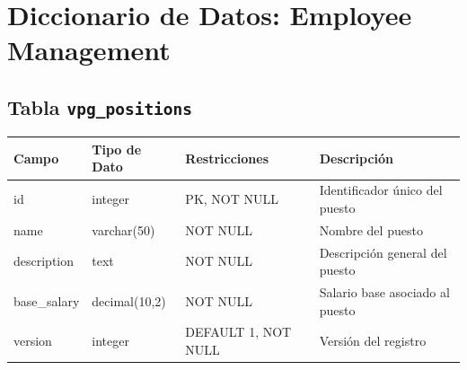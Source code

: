 \section{Diccionario de Datos: Employee Management}
\begin{center}
	\subsection{Tabla \texttt{vpg\_positions}}
	\small
	\begin{tabular}{|l|l|l|p{6cm}|}
		\hline
		\textbf{Campo} & \textbf{Tipo de Dato} & \textbf{Restricciones} & \textbf{Descripción}            \\
		\hline
		id             & integer               & PK, NOT NULL           & Identificador único del puesto  \\
		name           & varchar(50)           & NOT NULL               & Nombre del puesto               \\
		description    & text                  & NOT NULL               & Descripción general del puesto  \\
		base\_salary   & decimal(10,2)         & NOT NULL               & Salario base asociado al puesto \\
		version        & integer               & DEFAULT 1, NOT NULL    & Versión del registro            \\
		\hline
	\end{tabular}
	\normalsize


\end{center}
